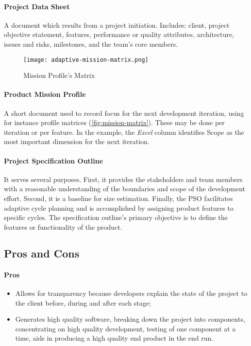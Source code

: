 \documentclass[main.tex]{subfiles}
\begin{document}
\paragraph{Project Data Sheet}
A document which results from a project initiation. Includes: client, project objective statement, features, performance or quality attributes, architecture, issues and risks, milestones, and the team's core members.

\begin{wrapfigure}[8]{r}[2em]{0.4\textwidth}
	\vspace*{-\baselineskip}
	\texttt{[image: adaptive-mission-matrix.png]}
	\caption{Mission Profile's Matrix\label{fig:mission-matrix}}
\end{wrapfigure}

\paragraph{Product Mission Profile}
A short document used to record focus for the next development iteration, using for instance profile matrices (\autoref{fig:mission-matrix}). These may be done per iteration or per feature.\supercite{adaptive-collaborative}
In the example, the \textsl{Excel} column identifies Scope as the most important dimension for the next iteration.

\paragraph{Project Specification Outline}
It serves several purposes.
First, it provides the stakeholders and team members with a reasonable understanding of the boundaries and scope of the development effort.
Second, it is a baseline for size estimation.
Finally, the PSO facilitates adaptive cycle planning and is accomplished by assigning product features to specific cycles.
The specification outline's primary objective is to define the features or functionality of the product.\supercite{adaptive-collaborative}

\subsection{Pros and Cons}

\paragraph{Pros}
\begin{itemize}
	\item Allows for transparency because developers explain the state of the project to the client before, during and after each stage;
	\item Generates high quality software, breaking down the project into components, concentrating on high quality development, testing of one component at a time, aids in producing a high quality end product in the end run.
\end{itemize}
\end{document}
